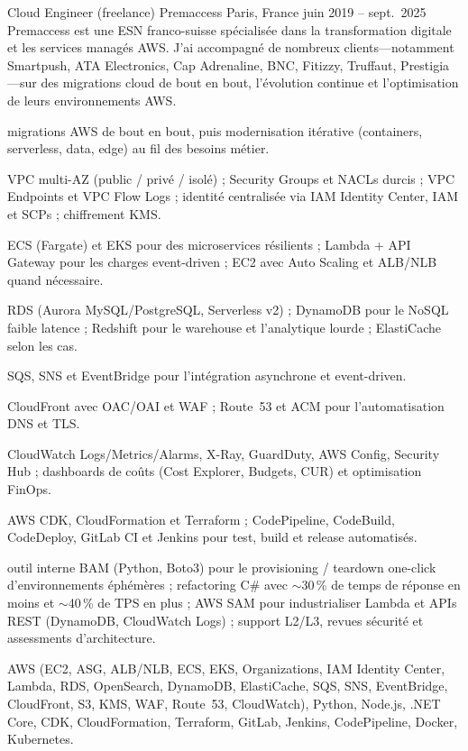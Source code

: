 \begin{cventries}
  \cventrywithintro
    {Cloud Engineer (freelance)}
    {Premaccess}
    {Paris, France}
    {juin 2019 – sept.\ 2025}
    {Premaccess est une ESN franco-suisse spécialisée dans la transformation digitale et les services managés AWS. J'ai accompagné de nombreux clients---notamment Smartpush, ATA Electronics, Cap Adrenaline, BNC, Fitizzy, Truffaut, Prestigia---sur des migrations cloud de bout en bout, l'évolution continue et l'optimisation de leurs environnements AWS.}
    {
      \begin{cvitemsafterintro}
        \item { migrations AWS de bout en bout, puis modernisation itérative (containers, serverless, data, edge) au fil des besoins métier.}
        \item { VPC multi-AZ (public / privé / isolé) ; Security Groups et NACLs durcis ; VPC Endpoints et VPC Flow Logs ; identité centralisée via IAM Identity Center, IAM et SCPs ; chiffrement KMS.}
        \item { ECS (Fargate) et EKS pour des microservices résilients ; Lambda + API Gateway pour les charges event-driven ; EC2 avec Auto Scaling et ALB/NLB quand nécessaire.}
        \item { RDS (Aurora MySQL/PostgreSQL, Serverless v2) ; DynamoDB pour le NoSQL faible latence ; Redshift pour le warehouse et l'analytique lourde ; ElastiCache selon les cas.}
        \item { SQS, SNS et EventBridge pour l'intégration asynchrone et event-driven.}
        \item { CloudFront avec OAC/OAI et WAF ; Route~53 et ACM pour l'automatisation DNS et TLS.}
        \item { CloudWatch Logs/Metrics/Alarms, X-Ray, GuardDuty, AWS Config, Security Hub ; dashboards de coûts (Cost Explorer, Budgets, CUR) et optimisation FinOps.}
        \item { AWS CDK, CloudFormation et Terraform ; CodePipeline, CodeBuild, CodeDeploy, GitLab CI et Jenkins pour test, build et release automatisés.}
        \item { outil interne BAM (Python, Boto3) pour le provisioning / teardown one-click d'environnements éphémères ; refactoring C\# avec $\sim$30\,\% de temps de réponse en moins et $\sim$40\,\% de TPS en plus ; AWS SAM pour industrialiser Lambda et APIs REST (DynamoDB, CloudWatch Logs) ; support L2/L3, revues sécurité et assessments d'architecture.}
      \end{cvitemsafterintro}
    }
    {AWS (EC2, ASG, ALB/NLB, ECS, EKS, Organizations, IAM Identity Center, Lambda, RDS, OpenSearch, DynamoDB, ElastiCache, SQS, SNS, EventBridge, CloudFront, S3, KMS, WAF, Route~53, CloudWatch), Python, Node.js, .NET Core, CDK, CloudFormation, Terraform, GitLab, Jenkins, CodePipeline, Docker, Kubernetes.}


\end{cventries}
